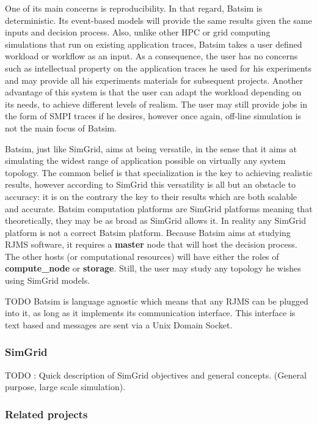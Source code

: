 \documentclass[12pt, a4paper]{memoir}
\begin{document}
One of its main concerns is reproducibility. In that regard, Batsim is
deterministic.  Its event-based models will provide the same results given the
same inputs and decision process. Also, unlike other HPC or grid computing
simulations that run on existing application traces, Batsim takes a user
defined workload or workflow as an input. As a consequence, the user has no
concerns such as intellectual property on the application traces he used for
his experiments and may provide all his experiments materials for subsequent
projects.  Another advantage of this system is that the user can adapt the
workload depending on its needs, to achieve different levels of realism. The
user may still provide jobs in the form of SMPI traces if he desires, however
once again, off-line simulation is not the main focus of Batsim.

Batsim, just like SimGrid, aims at being versatile, in the sense that it aims
at simulating the widest range of application possible on virtually  any system
topology. The common belief is that specialization is the key to achieving
realistic results, however according to SimGrid this versatility is all but an
obstacle to accuracy\cite{casanova:hal-01017319}: it is on the contrary the key
to their results which are both scalable and accurate. Batsim computation
platforms are SimGrid platforms meaning that theoretically, they may be as
broad as SimGrid allows it. In reality any SimGrid platform is not a correct
Batsim platform. Because Batsim aims at studying RJMS software, it requires a
\textbf{master} node that will host the decision process. The other hosts (or
computational resources) will have either the roles of \textbf{compute\_node}
or \textbf{storage}. Still, the user may study any topology he wishes using
SimGrid models.

TODO
Batsim is language agnostic which
means that any RJMS can be plugged into it, as long as it implements its
communication interface. This interface is text based and messages are sent via
a Unix Domain Socket.



\subsubsection{SimGrid}

 TODO : Quick description of SimGrid objectives and general concepts. (General
 purpose, large scale simulation).



\subsubsection{Related projects}
\end{document}

